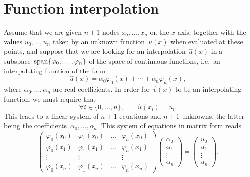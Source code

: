 \section{Function interpolation}
Assume that we are given $n+1$ nodes $x_0, \dotsc, x_n$ on the $x$ axis,
together with the values $u_0, \dotsc, u_n$ taken by an unknown function~$u(x)$ when evaluated at these points,
and suppose that we are looking for an interpolation~$\widehat u(x)$ in a subspace~$\operatorname{span} \{\varphi_0, \dotsc, \varphi_n\}$
of the space of continuous functions, i.e.~an interpolating function of the form
\[
    \widehat u(x) = \alpha_0 \varphi_0(x) + \dotsb + \alpha_n \varphi_n(x),
\]
where $\alpha_0, \dotsc, \alpha_n$ are real coefficients.
In order for~$\widehat u(x)$ to be an interpolating function,
we must require that
\[
    \forall i \in \{0, \dotsc, n\}, \qquad
    \widehat u(x_i) = u_i.
\]
This leads to a linear system of $n+1$ equations and $n+1$ unknowns,
the latter being the coefficients~$\alpha_0, \dotsc, \alpha_n$.
This system of equations in matrix form reads
\begin{equation}
    \label{eq:linear_system_interpolation}
    \begin{pmatrix}
        \varphi_0(x_0) & \varphi_1(x_0) & \hdots & \varphi_n(x_0) \\
        \varphi_0(x_1) & \varphi_1(x_1) & \hdots & \varphi_n(x_1) \\
        \vdots & \vdots & & \vdots \\
        \varphi_0(x_n) & \varphi_1(x_n) & \hdots & \varphi_n(x_n)
    \end{pmatrix}
    \begin{pmatrix}
        \alpha_0 \\
        \alpha_1 \\
        \vdots \\
        \alpha_n
    \end{pmatrix}
    =
    \begin{pmatrix}
        u_0 \\
        u_1 \\
        \vdots \\
        u_n
    \end{pmatrix}.
\end{equation}

